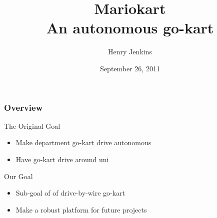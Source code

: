 \documentclass{beamer}
\begin{document}
\ECFAugie

\begin{frame}
\title{Mariokart \\ An autonomous go-kart}
\author{Henry Jenkins}
\date{September 26, 2011}
\maketitle
\end{frame}

\begin{frame}
\frametitle{Overview}
The Original Goal
\begin{itemize}
\item Make department go-kart drive autonomous
\item Have go-kart drive around uni
\end{itemize}

Our Goal
\begin{itemize}
\item Sub-goal of of drive-by-wire go-kart
\item Make a robust platform for future projects
\end{itemize}
\end{frame}
\end{document}
